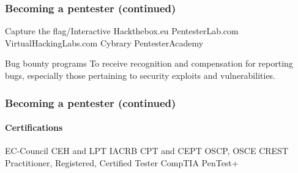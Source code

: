 \begin{frame}
    \frametitle{Becoming a pentester (continued)}

    \note[item]{
    }
    
	\begin{outline}
		\1 Capture the flag/Interactive
		\2 Hackthebox.eu
		\2 PentesterLab.com
		\2 VirtualHackingLabs.com
		\1 Cybrary
		\1 PentesterAcademy
	\end{outline}
	
	\begin{exampleblock}{Bug bounty programs}
	To receive recognition and compensation for reporting bugs, especially those pertaining to security exploits and vulnerabilities.
	\end{exampleblock}
\end{frame}

\begin{frame}
    \frametitle{Becoming a pentester (continued)}
    \framesubtitle{Certifications}


	\begin{outline}
		\1 EC-Council CEH and LPT
		\1 IACRB CPT and CEPT
		\1 OSCP, OSCE
		\1 CREST Practitioner, Registered, Certified Tester
		\1 CompTIA PenTest+
	\end{outline}
\end{frame}
